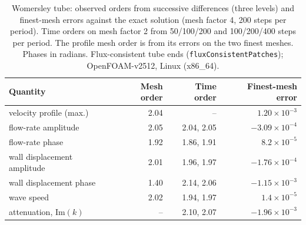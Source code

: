 \begin{table}[htbp]
	\centering
	\small
	\setlength{\tabcolsep}{4pt}
	\caption{Womersley tube: observed orders from successive differences (three levels) and finest-mesh errors against the exact solution (mesh factor 4, 200 steps per period). Time orders on mesh factor 2 from 50/100/200 and 100/200/400 steps per period. The profile mesh order is from its errors on the two finest meshes. Phases in radians. Flux-consistent tube ends (\texttt{fluxConsistentPatches}); OpenFOAM-v2512, Linux (x86\_64).}
	\label{tab:womersley}
	\begin{tabular}{lrrr}
		\toprule
		Quantity & Mesh order & Time order & Finest-mesh error \\
		\midrule
		velocity profile (max.) & 2.04 & -- & $1.20\times10^{-3}$ \\
		flow-rate amplitude & 2.05 & 2.04, 2.05 & $-3.09\times10^{-4}$ \\
		flow-rate phase & 1.92 & 1.86, 1.91 & $8.2\times10^{-5}$ \\
		wall displacement amplitude & 2.01 & 1.96, 1.97 & $-1.76\times10^{-4}$ \\
		wall displacement phase & 1.40 & 2.14, 2.06 & $-1.15\times10^{-3}$ \\
		wave speed & 2.02 & 1.94, 1.97 & $1.4\times10^{-5}$ \\
		attenuation, $\mathrm{Im}(k)$ & -- & 2.10, 2.07 & $-1.96\times10^{-3}$ \\
		\bottomrule
	\end{tabular}
\end{table}

